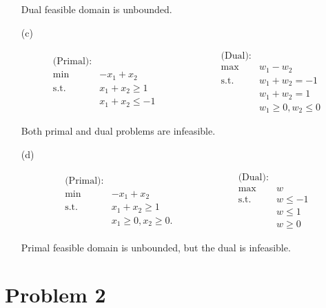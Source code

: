 \documentclass[12pt]{article}
\begin{document}
\begin{enumerate}
Dual feasible domain is unbounded. 

\item [(c)]

\begin{equation*}
\begin{array}{rl}
\text{(Primal):} & \\
\min & -x_1 + x_2 \\\text{s.t.} & x_1 + x_2 \geqslant 1 \\
& x_1 + x_2 \leqslant -1
\end{array} \qquad \qquad \qquad
\begin{array}{rl}
\text{(Dual):} & \\
\max & w_1 - w_2 \\
\text{s.t.} & w_1 + w_2 = -1 \\
& w_1 + w_2 = 1\\
& w_1 \geqslant0, w_2 \leqslant 0
\end{array}
\end{equation*}

Both primal and dual problems are infeasible.

\item [(d)]

\begin{equation*}
\begin{array}{rl}
\text{(Primal):} & \\
\min & -x_1 + x_2 \\\text{s.t.} & x_1 + x_2 \geqslant 1 \\
& x_1 \geqslant 0, x_2 \geqslant 0.
\end{array} \qquad \qquad \qquad
\begin{array}{rl}
\text{(Dual):} & \\
\max & w \\
\text{s.t.} & w \leqslant -1 \\
& w \leqslant 1 \\
& w \geqslant 0
\end{array}
\end{equation*}

Primal feasible domain is unbounded, but the dual is infeasible.

\end{enumerate}

\section*{Problem 2}
\end{document}
